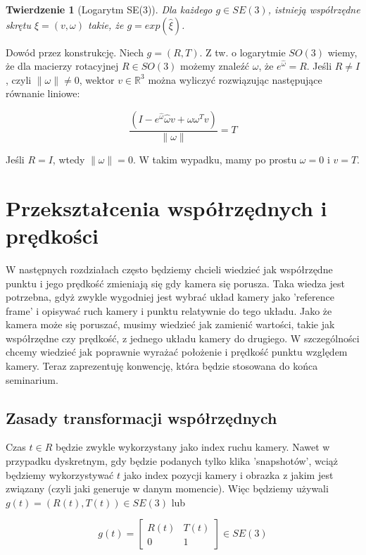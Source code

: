 \documentclass[a4paper,12pt]{article}
\newtheorem{theo}[defi]{Twierdzenie}
\newcommand{\RR}{\mathbb{R}^3}
\begin{document}
\begin{theo}[Logarytm SE(3)]
Dla każdego $g \in SE(3)$, istnieją współrzędne skrętu $\xi = (v,\omega)$ takie, że $g=exp(\hat{\xi})$.
\end{theo}

Dowód przez konstrukcję. Niech $g=(R,T)$. Z tw. o logarytmie $SO(3)$ wiemy, że dla macierzy rotacyjnej $R \in SO(3)$ możemy znaleźć $\omega$, że $e^{\hat{\omega}}=R$. Jeśli $R \neq I$, czyli $\| \omega \| \neq 0$, wektor $v \in \RR$ można wyliczyć rozwiązując następujące równanie liniowe:

\begin{equation}
\frac{(I-e^{\hat{\omega}}\hat{\omega}v+\omega\omega^Tv)}{\| \omega \|} = T
\end{equation}

Jeśli $R=I$, wtedy $\| \omega \| = 0$. W takim wypadku, mamy po prostu $\omega=0$ i $v=T$.



\section{Przekształcenia współrzędnych i prędkości}

W następnych rozdziałach często będziemy chcieli wiedzieć jak współrzędne punktu i jego prędkość zmieniają się gdy kamera się porusza. Taka wiedza jest potrzebna, gdyż zwykle wygodniej jest wybrać układ kamery jako 'reference frame' i opisywać ruch kamery i punktu relatywnie do tego układu. Jako że kamera może się poruszać, musimy wiedzieć jak zamienić wartości, takie jak współrzędne czy prędkość, z jednego układu kamery do drugiego. W szczególności chcemy wiedzieć jak poprawnie wyrażać położenie i prędkość punktu względem kamery. Teraz zaprezentuję konwencję, która będzie stosowana do końca seminarium.

\subsection{Zasady transformacji współrzędnych}

Czas $t \in R$ będzie zwykle wykorzystany jako index ruchu kamery. Nawet w przypadku dyskretnym, gdy będzie podanych tylko klika 'snapshotów', wciąż będziemy wykorzystywać $t$ jako index pozycji kamery i obrazka z jakim jest związany (czyli jaki generuje w danym momencie). Więc będziemy używali $g(t)=(R(t),T(t)) \in SE(3)$ lub

\begin{equation}
g(t)=\begin{bmatrix} R(t) & T(t) \\ 0 & 1 \end{bmatrix} \in SE(3)
\end{equation}
\end{document}
